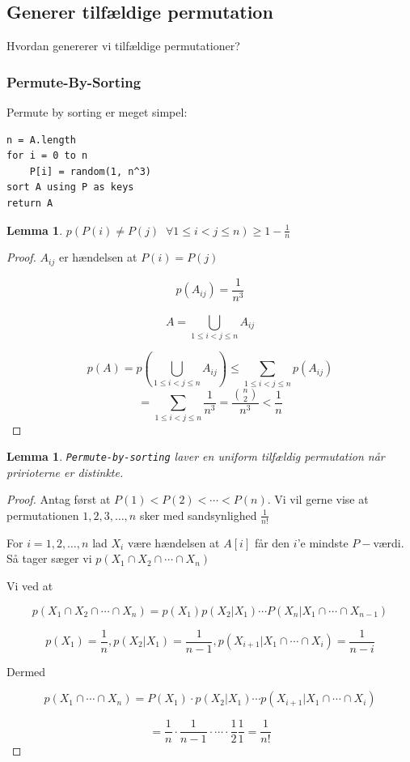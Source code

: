 \documentclass[11pt]{article}
\newtheorem{lemma}[theorem]{Lemma}
\theoremstyle{definition}
\theoremstyle{remark}
\begin{document}
\subsection{Generer tilfældige permutation}
\label{subsec:label}

Hvordan genererer vi tilfældige permutationer? 

\subsubsection{Permute-By-Sorting}

Permute by sorting er meget simpel:

\begin{verbatim}
n = A.length
for i = 0 to n
    P[i] = random(1, n^3)
sort A using P as keys
return A
\end{verbatim}

\begin{lemma}
$p(P(i) \neq P(j)\;\;\forall 1 \leq i < j \leq n) \geq 1 - \frac{1}{n}$
\end{lemma}

\begin{proof}
  $A_{ij}$ er hændelsen at $P(i) = P(j)$

  \[
p(A_{ij}) = \frac{1}{n^{3}}
  \]

  \[
A = \bigcup\limits_{1 \leq i < j \leq n}^{}A_{ij}
  \]

  \[
p(A) = p( \bigcup\limits_{1 \leq i < j \leq n}^{}A_{ij}) \leq \sum_{1 \leq i < j \leq n}^{}p(A_{ij}) 
  \]
  \[
= \sum_{1 \leq i < j \leq n}^{} \frac{1}{n^{3}} = \frac{\binom{n}{2}}{n^{3}} < \frac{1}{n}
  \]
\end{proof}

\begin{lemma}
\texttt{Permute-by-sorting} laver en uniform tilfældig permutation når pririoterne er distinkte. 
\end{lemma}

\begin{proof}
Antag først at $P(1) < P(2) < \cdots < P(n)$. Vi vil gerne vise at permutationen $1, 2, 3, \ldots, n$ sker med sandsynlighed $\frac{1}{n!}$

For $i = 1, 2, \ldots, n$ lad $X_{i} $ være hændelsen at $A[i]$ får den $i$'e mindste $P-$værdi. Så tager sæger vi $p(X_1 \cap X_{2} \cap \cdots \cap X_{n})$

Vi ved at

\[
p(X_{1} \cap X_{2} \cap \cdots \cap X_{n}) = p(X_{1}) p(X_{2}|X_{1}) \cdots P(X_{n}| X_{1} \cap \cdots \cap X_{n-1}) 
\]


\[
p(X_{1}) = \frac{1}{n}, p(X_{2}|X_{1}) = \frac{1}{n-1}, p(X_{i+1} | X_{1} \cap \cdots \cap X_{i}) = \frac{1}{n-i}
\]

Dermed

\[
p(X_{1} \cap \cdots \cap X_{n}) = P(X_{1}) \cdot p(X_{2}| X_{1}) \cdots p(X_{i+1}|X_{1} \cap \cdots \cap X_{i}) 
\]

\[
= \frac{1}{n} \cdot \frac{1}{n-1} \cdot \cdots \cdot \frac{1}{2} \frac{1}{1} = \frac{1}{n!}
\]

\end{proof}
\end{document}
